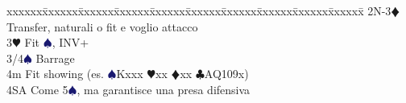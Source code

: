 \documentclass[a4paper,italian]{article}
\newcommand{\BC}{\textcolor{OliveGreen}{$\clubsuit$}}
\newcommand{\BD}{\textcolor{RedOrange}{$\vardiamondsuit$}}
\newcommand{\BH}{\textcolor{Red2}{$\varheartsuit${}}}
\newcommand{\BS}{\textcolor{MidnightBlue}{$\spadesuit${}}}
\newenvironment{bidtable}
{\begin{tabbing}

    xxxxxx\=xxxxxx\=xxxxxx\=xxxxxx\=xxxxxx\=xxxxxx\=xxxxxx\=xxxxxx\=xxxxxx\=xxxxxx\=\kill}
{\end{tabbing} }%
\begin{document}
\begin{multicols*}{2}
\begin{bidtable}
                                            2N-3\BD\> Transfer, naturali o fit e voglio attacco\\
                                            3\BH\> Fit \BS, INV+\\
                                            3/4\BS\> Barrage\\
                                            4m\> Fit showing (es. \BS Kxxx \BH xx \BD xx \BC AQ109x)\\
                                            4SA\> Come 5\BS, ma garantisce una presa difensiva\\
                                        \end{bidtable}

                                    \end{multicols*}

                                    \pagebreak
\end{document}
